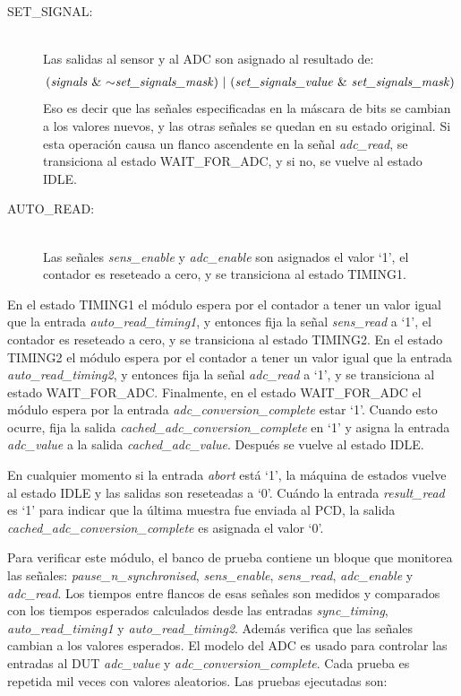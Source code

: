 \documentclass[a4paper, twoside, 11pt]{report}
\begin{document}
\newpage

\begin{description}
  \item[SET\_SIGNAL:] \hfill \\ Las salidas al sensor y al ADC son asignado al resultado de:
  \begin{align*}
      \text{(\textit{signals} \& $\sim$\textit{set\_signals\_mask}) $\vert$ (\textit{set\_signals\_value} \& \textit{set\_signals\_mask})}
  \end{align*}
  Eso es decir que las señales especificadas en la máscara de bits se cambian a los valores nuevos, y las otras señales se quedan en su estado original. Si esta operación causa un flanco ascendente en la señal \textit{adc\_read}, se transiciona al estado WAIT\_FOR\_ADC, y si no, se vuelve al estado IDLE.
  \item[AUTO\_READ:] \hfill \\ Las señales \textit{sens\_enable} y \textit{adc\_enable} son asignados el valor ‘1’, el contador es reseteado a cero, y se transiciona al estado TIMING1.
\end{description}

En el estado TIMING1 el módulo espera por el contador a tener un valor igual que la entrada \textit{auto\_read\_timing1}, y entonces fija la señal \textit{sens\_read} a ‘1’, el contador es reseteado a cero, y se transiciona al estado TIMING2. En el estado TIMING2 el módulo espera por el contador a tener un valor igual que la entrada \textit{auto\_read\_timing2}, y entonces fija la señal \textit{adc\_read} a ‘1’, y se transiciona al estado WAIT\_FOR\_ADC. Finalmente, en el estado WAIT\_FOR\_ADC el módulo espera por la entrada \textit{adc\_conversion\_complete} estar ‘1’. Cuando esto ocurre, fija la salida \textit{cached\_adc\_conversion\_complete} en ‘1’ y asigna la entrada \textit{adc\_value} a la salida \textit{cached\_adc\_value}. Después se vuelve al estado IDLE.

En cualquier momento si la entrada \textit{abort} está ‘1’, la máquina de estados vuelve al estado IDLE y las salidas son reseteadas a ‘0’. Cuándo la entrada \textit{result\_read} es ‘1’ para indicar que la última muestra fue enviada al PCD, la salida \textit{cached\_adc\_conversion\_complete} es asignada el valor ‘0’.

Para verificar este módulo, el banco de prueba contiene un bloque que monitorea las señales: \textit{pause\_n\_synchronised}, \textit{sens\_enable}, \textit{sens\_read}, \textit{adc\_enable} y \textit{adc\_read}. Los tiempos entre flancos de esas señales son medidos y comparados con los tiempos esperados calculados desde las entradas \textit{sync\_timing}, \textit{auto\_read\_timing1} y \textit{auto\_read\_timing2}. Además verifica que las señales cambian a los valores esperados. El modelo del ADC es usado para controlar las entradas al DUT \textit{adc\_value} y \textit{adc\_conversion\_complete}. Cada prueba es repetida mil veces con valores aleatorios. Las pruebas ejecutadas son:
\end{document}
